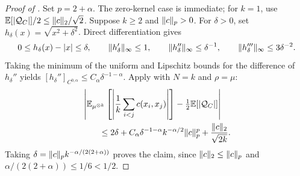 \documentclass[11pt,reqno]{amsart}
\numberwithin{equation}{section}
\theoremstyle{plain}
\theoremstyle{remark}
\DeclarePairedDelimiter{\abs}{\lvert}{\rvert}
\DeclarePairedDelimiter{\norm}{\lVert}{\rVert}
\newcommand{\E}{{\mathbb{E}}}
\begin{document}
\begin{proof}[Proof of ]
Set $p=2+\alpha$.  The zero-kernel case is immediate; for $k=1$, use
$\E[\abs{\mathcal Q_C}]/2\leq\norm c_2/\sqrt2$.  Suppose $k\geq2$ and
$\norm c_p>0$.  For $\delta>0$, set $h_\delta(x)=\sqrt{x^2+\delta^2}$.
Direct differentiation gives
\begin{equation}\label{quant-tools:eq-smoothing}
 0\leq h_\delta(x)-\abs x\leq\delta,\qquad
 \norm{h_\delta'}_\infty\leq1,\qquad
 \norm{h_\delta''}_\infty\leq\delta^{-1},\qquad
 \norm{h_\delta'''}_\infty\leq3\delta^{-2}.
\end{equation}
Taking the minimum of the uniform and Lipschitz bounds for the difference
of $h_\delta''$ yields
$[h_\delta'']_{C^{0,\alpha}}\leq C_\alpha\delta^{-1-\alpha}$.
Apply  with $N=k$ and $\rho=\mu$:
\begin{align}
 &\left|\E_{\mu^{\otimes k}}\left[
    \left|\frac1k\sum_{i<j}c(x_i,x_j)\right|\right]
       -\tfrac12\E[\abs{\mathcal Q_C}]\right|\notag\\
 &\qquad\leq2\delta+C_\alpha\delta^{-1-\alpha}
             k^{-\alpha/2}\norm c_p^p+\frac{\norm c_2}{\sqrt{2k}}.
 \label{quant-tools:eq-presmoothing}
\end{align}
Taking $\delta=\norm c_p k^{-\alpha/(2(2+\alpha))}$ proves the claim,
since $\norm c_2\leq\norm c_p$ and
$\alpha/(2(2+\alpha))\leq1/6<1/2$.
\end{proof}




\end{document}
